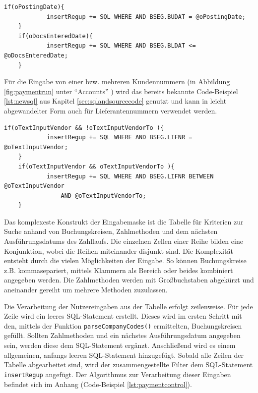 \begin{lstlisting}[caption={Einfügung von zusätzlichen Filtern}, label={lst:budat}, language=JavaScriptSQL]
	if(oPostingDate){
			insertRegup += SQL WHERE AND BSEG.BUDAT = @oPostingDate;
	}
	if(oDocsEnteredDate){
			insertRegup += SQL WHERE AND BSEG.BLDAT <= @oDocsEnteredDate;
	}
\end{lstlisting}

Für die Eingabe von einer bzw. mehreren Kundennummern (in Abbildung \ref{fig:paymentrun} unter ``Accounts'' ) wird das bereits bekannte Code-Beispiel \ref{lst:newsql} aus Kapitel \ref{sec:sqlandsourcecode} genutzt und kann in leicht abgewandelter Form auch für Lieferantennummern verwendet werden.

\begin{lstlisting}[caption={Unterscheidung zwischen Einzel- und Bereichsfilter}, label={lst:vendor}, language=JavaScriptSQL]
	if(oTextInputVendor && !oTextInputVendorTo ){
			insertRegup += SQL WHERE AND BSEG.LIFNR = @oTextInputVendor;
	}
	if(oTextInputVendor && oTextInputVendorTo ){
			insertRegup += SQL WHERE AND BSEG.LIFNR BETWEEN @oTextInputVendor
				AND @oTextInputVendorTo;
	}
\end{lstlisting}

Das komplexeste Konstrukt der Eingabemaske ist die Tabelle für Kriterien zur Suche anhand von Buchungskreisen, Zahlmethoden und dem nächsten Ausführungsdatums des Zahllaufs.
Die einzelnen Zellen einer Reihe bilden eine Konjunktion, wobei die Reihen miteinander disjunkt sind.
Die Komplexität entsteht durch die vielen Möglichkeiten der Eingabe.
So können Buchungskreise z.B. kommasepariert, mittels Klammern als Bereich oder beides kombiniert angegeben werden.
Die Zahlmethoden werden mit Großbuchstaben abgekürzt und aneinander gereiht um mehrere Methoden zuzulassen.

Die Verarbeitung der Nutzereingaben aus der Tabelle erfolgt zeilenweise.
Für jede Zeile wird ein leeres SQL-Statement erstellt.
Dieses wird im ersten Schritt mit den, mittels der Funktion \texttt{parseCompanyCodes()} ermittelten, Buchungskreisen gefüllt.
Sollten Zahlmethoden und ein nächstes Ausführungsdatum angegeben sein, werden diese dem SQL-Statement ergänzt.
Anschließend wird es einem allgemeinen, anfangs leeren SQL-Statement hinzugefügt.
Sobald alle Zeilen der Tabelle abgearbeitet sind, wird der zusammengestellte Filter dem SQL-Statement \texttt{insertRegup} angefügt.
Der Algorithmus zur Verarbeitung dieser Eingaben befindet sich im Anhang (Code-Beispiel \ref{lst:paymentcontrol}).

